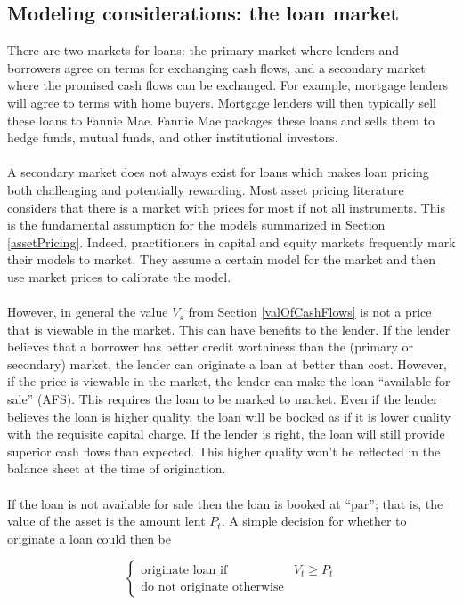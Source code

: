 \documentclass{article}
\theoremstyle{definition}
\begin{document}
\subsection{Modeling considerations: the loan market}
\label{loanMarket}
There are two markets for loans: the primary market where lenders and borrowers agree on terms for exchanging cash flows, and a secondary market where the promised cash flows can be exchanged.  For example, mortgage lenders will agree to terms with home buyers.  Mortgage lenders will then typically sell these loans to Fannie Mae.  Fannie Mae packages these loans and sells them to hedge funds, mutual funds, and other institutional investors.  
\\
\\
A secondary market does not always exist for loans which makes loan pricing both challenging and potentially rewarding. Most asset pricing literature considers that there is a market with prices for most if not all instruments.  This is the fundamental assumption for the models summarized in Section \ref{assetPricing}.  Indeed, practitioners in capital and equity markets frequently mark their models to market.  They assume a certain model for the market and then use market prices to calibrate the model.  
\\
\\
However, in general the value \(V_s\) from Section \ref{valOfCashFlows} is not a price that is viewable in the market.  This can have benefits to the lender.  If the lender believes that a borrower has better credit worthiness than the (primary or secondary) market, the lender can originate a loan at better than cost.  However, if the price is viewable in the market, the lender can make the loan ``available for sale'' (AFS).  This requires the loan to be marked to market.  Even if the lender believes the loan is higher quality, the loan will be booked as if it is lower quality with the requisite capital charge.  If the lender is right, the loan will still provide superior cash flows than expected.  This higher quality won't be reflected in the balance sheet at the time of origination. 
\\
\\
If the loan is not available for sale then the loan is booked at ``par''; that is, the value of the asset is the amount lent \(P_t\).  A simple decision for whether to originate a loan could then be 

\begin{equation}
\left\{
\begin{array}{ll}
\text{originate loan if} & V_t \geq P_t\\
\text{do not originate otherwise} 
\end{array} \right.
\end{equation}
\end{document}
